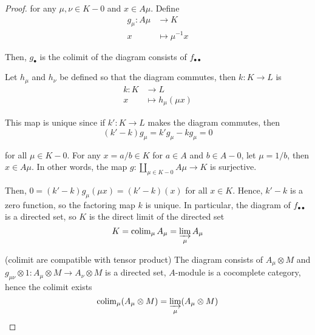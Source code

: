 \begin{proof}
	for any $\mu, \nu \in K - 0$ and $x \in A \mu$. Define 
	\begin{align*}
		g_\mu: A \mu &\to K \\
		x &\mapsto \mu^{-1} x
	\end{align*}
	
	Then, $g_\bullet$ is the colimit of the diagram consists of $f_{\bullet \bullet}$
	\begin{center}
	\end{center}
	
	Let $h_\mu$ and $h_\nu$ be defined so that the diagram commutes, then $k: K \to L$ is
	\begin{align*}
		k: K &\to L \\
			x &\mapsto h_\mu(\mu x)
	\end{align*}
	
	This map is unique since if $k': K \to L$ makes the diagram commutes, then 
	$$
		(k' - k) g_\mu = k' g_\mu - k g_\mu = 0 
	$$
	
	for all $\mu \in K - 0$. For any $x = a / b \in K$ for $a \in A$ and $b \in A - 0$, let $\mu = 1 /b$, then $x \in A \mu$. In other words, the map $g: \coprod_{\mu \in K - 0} A\mu \to K$ is surjective.
	\begin{center}
	\end{center}
	Then, $0 = (k' - k) g_\mu (\mu x) = (k' - k)(x)$ for all $x \in K$. Hence, $k' - k$ is a zero function, so the factoring map $k$ is unique. In particular, the diagram of $f_{\bullet \bullet}$ is a directed set, so $K$ is the direct limit of the directed set
	$$
		K = \operatorname{colim}_\mu A_\mu = \varinjlim_\mu A_\mu
	$$
	
	(colimit are compatible with tensor product) The diagram consists of $A_\mu \otimes M$ and $g_{\mu \nu} \otimes 1: A_\mu \otimes M \to A_\nu \otimes M$ is a directed set, $A$-module is a cocomplete category, hence the colimit exists
	$$
		\operatorname{colim}_\mu (A_\mu \otimes M) = \varinjlim_\mu (A_\mu \otimes M)
	$$
	

\end{proof}
